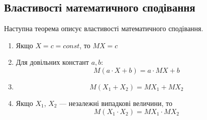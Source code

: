 \subsection{Властивості математичного сподівання}

Наступна теорема описує властивості математичного сподівання.

\begin{theorem}
    \begin{enumerate}
        \item Якщо $X = c = const$, то $MX = c$
        
        \item Для довільних констант $a, b$:
            \begin{equation}
                M(a \cdot X + b) = a \cdot MX + b
            \end{equation}
        
        \item
            \begin{equation}
                M(X_1 + X_2) = MX_1 + MX_2
            \end{equation}
        
        \item Якщо $X_1$, $X_2$ --- незалежні випадкові величини, то
            \begin{equation}
                M(X_1 \cdot X_2) = MX_1 \cdot MX_2
            \end{equation}
    \end{enumerate}
\end{theorem}
    
